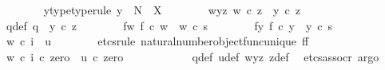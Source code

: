 \begin{isabellebody}
\ \ \ \ \ \ \isamarkupfalse%
\ y{\isacharunderscore}{\kern0pt}type{\isacharbrackleft}{\kern0pt}type{\isacharunderscore}{\kern0pt}rule{\isacharbrackright}{\kern0pt}{\isacharcolon}{\kern0pt}\ {\isachardoublequoteopen}y\ {\isacharcolon}{\kern0pt}\ N\ {\isasymrightarrow}\ X{\isachardoublequoteclose}\isanewline
\ \ \ \ \ \ \isamarkupfalse%
\ w{\isacharunderscore}{\kern0pt}y{\isacharunderscore}{\kern0pt}z{\isacharcolon}{\kern0pt}\ {\isachardoublequoteopen}w\ {\isasymcirc}\isactrlsub c\ z\ {\isacharequal}{\kern0pt}\ y\ {\isasymcirc}\isactrlsub c\ z{\isachardoublequoteclose}\isanewline
\ \ \ \ \ \ \isamarkupfalse%
\ q{\isacharunderscore}{\kern0pt}def{\isacharcolon}{\kern0pt}\ {\isachardoublequoteopen}q\ {\isacharequal}{\kern0pt}\ y\ {\isasymcirc}\isactrlsub c\ z{\isachardoublequoteclose}\isanewline
\ \ \ \ \ \ \isamarkupfalse%
\ f{\isacharunderscore}{\kern0pt}w{\isacharcolon}{\kern0pt}\ {\isachardoublequoteopen}f\ {\isasymcirc}\isactrlsub c\ w\ {\isacharequal}{\kern0pt}\ w\ {\isasymcirc}\isactrlsub c\ s{\isachardoublequoteclose}\isanewline
\ \ \ \ \ \ \isamarkupfalse%
\ f{\isacharunderscore}{\kern0pt}y{\isacharcolon}{\kern0pt}\ {\isachardoublequoteopen}f\ {\isasymcirc}\isactrlsub c\ y\ {\isacharequal}{\kern0pt}\ y\ {\isasymcirc}\isactrlsub c\ s{\isachardoublequoteclose}\isanewline
\isanewline
\ \ \ \ \ \ \isamarkupfalse%
\ {\isachardoublequoteopen}w\ {\isasymcirc}\isactrlsub c\ i\ {\isacharequal}{\kern0pt}\ u{\isachardoublequoteclose}\isanewline
\ \ \ \ \ \ \isamarkupfalse%
\ {\isacharparenleft}{\kern0pt}etcs{\isacharunderscore}{\kern0pt}rule\ natural{\isacharunderscore}{\kern0pt}number{\isacharunderscore}{\kern0pt}object{\isacharunderscore}{\kern0pt}func{\isacharunderscore}{\kern0pt}unique{\isacharbrackleft}{\kern0pt}\ f{\isacharequal}{\kern0pt}f{\isacharbrackright}{\kern0pt}{\isacharparenright}{\kern0pt}\isanewline
\ \ \ \ \ \ \ \ \isamarkupfalse%
\ {\isachardoublequoteopen}{\isacharparenleft}{\kern0pt}w\ {\isasymcirc}\isactrlsub c\ i{\isacharparenright}{\kern0pt}\ {\isasymcirc}\isactrlsub c\ zero\ {\isacharequal}{\kern0pt}\ u\ {\isasymcirc}\isactrlsub c\ zero{\isachardoublequoteclose}\isanewline
\ \ \ \ \ \ \ \ \ \ \isamarkupfalse%
\ q{\isacharunderscore}{\kern0pt}def\ u{\isacharunderscore}{\kern0pt}def\ w{\isacharunderscore}{\kern0pt}y{\isacharunderscore}{\kern0pt}z\ z{\isacharunderscore}{\kern0pt}def\ \isamarkupfalse%
\ {\isacharparenleft}{\kern0pt}etcs{\isacharunderscore}{\kern0pt}assocr{\isacharcomma}{\kern0pt}\ argo{\isacharparenright}{\kern0pt}\isanewline

\end{isabellebody}
